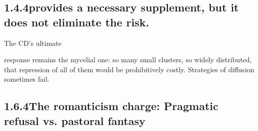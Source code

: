 \subsection{1.4.4\quad provides a necessary supplement, but it does not eliminate the risk.}

The CD’s ultimate

response remains the mycelial one: so many small clusters, so widely distributed, that repression of all of them would be prohibitively costly. Strategies of diffusion sometimes fail.

\subsection{1.6.4\quad The romanticism charge: Pragmatic refusal vs. pastoral fantasy}

